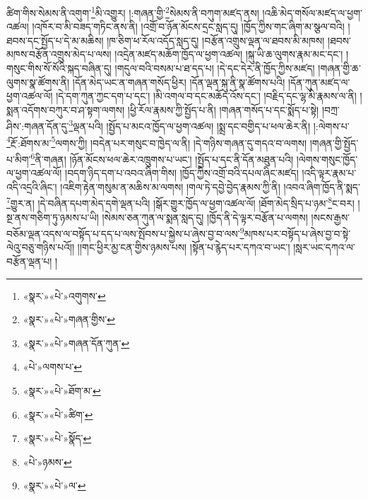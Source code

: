 ཚིག་གིས་སེམས་ནི་འགུག་\footnote{«སྣར་»«པེ་»འགུགས་}མི་འགྱུར། །:གཞན་གྱི་\footnote{«སྣར་»«པེ་»གཞན་གྱིས་}སེམས་ནི་བཀུག་མཛད་ནས། །འཆི་མེད་གསོལ་མཛད་ལ་ཕྱག་འཚལ། །འཁོར་བ་མི་བཟད་གཏིང་ནས་ནི། །འགྲོ་བ་ཉོན་མོངས་དྲང་སླད་དུ། །ཁྱོད་ཀྱིས་གང་ཞིག་མ་སྩལ་བའི། །ཐབས་དང་སྤྱོད་པ་དེ་མ་མཆིས། །ཁ་ཅིག་ཕ་རོལ་འདོད་སླད་དུ། །བརྩོན་འགྲུས་ལྡན་ལ་ཐབས་མི་མཁས། །ཐབས་མཁས་བརྩོན་འགྲུས་མེད་པ་ལས། །འདྲེན་མཛད་མཆོག་ཁྱོད་ལ་ཕྱག་འཚལ། །སྐུ་ཡི་ཆ་ལུགས་རྣམ་མང་དང་། །གསུང་གིས་སོ་སོའི་སྐད་བཞིན་དུ། །གདུལ་བའི་བསམ་པ་ཐ་དད་པ། །དེ་དང་དེར་ནི་ཁྱོད་ཀྱིས་མཛད། །གཞན་གྱི་ཆ་ལུགས་སྣ་ཚོགས་ནི། །དོན་མེད་ཡང་ན་གཞན་གསོད་ཕྱིར། །དོན་ལྡན་སྐུ་ནི་སྣ་ཚོགས་པའི། །དོན་ཀུན་མཛད་ལ་ཕྱག་འཚལ་ལོ། །དེ་དག་ཀུན་ཀྱང་དག་པ་དང་། །མི་འགལ་བ་དང་མཆོད་འོས་དང་། །བརྗིད་དང་ལྷ་མི་རྣམས་ལ་ནི། །སྨན་འདོགས་བཀུར་བ་ཤ་སྟག་ལགས། །ཕྱི་རོལ་རྣམས་ཀྱི་སྤྱོད་པ་ནི། །གཞན་གསོད་པ་དང་སྨོད་པ་སྟེ། །བཀྲ་ཤིས་:གཞན་དོན་དུ་\footnote{«སྣར་»«པེ་»གཞན་དོན་ཀུན་}ལྡན་པའི། །སྤྱོད་པ་མངའ་ཁྱོད་ལ་ཕྱག་འཚལ། །སྨྲ་དང་བགྱིད་པ་ཕལ་ཆེར་ནི། །:ལེགས་པ་\footnote{«པེ་»ལགས་པ་}རྔོ་:ཐོགས་མ་\footnote{«སྣར་»«པེ་»ཐོག་མ་}ལགས་ཀྱི། །བདེན་པར་གསུང་བ་ཁྱེད་ལ་ནི། །དེ་གཉིས་གཞན་དུ་གདའ་བ་ལགས། །གཞན་གྱི་སྤྱོད་པ་མིག་\footnote{«སྣར་»«པེ་»ཚིག་}ནི་གཞན། །ཉོན་མོངས་ཕལ་ཆེར་འཁྲུགས་པ་ཡང་། །སྤྱོད་པ་དང་ནི་དོན་མཐུན་པའི། །ལེགས་གསུང་ཁྱོད་ལ་ཕྱག་འཚལ་ལོ། །བདག་ཉིད་དག་པ་འབའ་ཞིག་གིས། །ཁྱོད་ཀྱིས་འགྲོ་བའི་དཔལ་ཞིང་མཛད། །འདི་ལྟར་རྣམ་པ་འདི་འདྲའི་ཞིང་། །འཇིག་རྟེན་གསུམ་ན་མཆིས་མ་ལགས། །གལ་ཏེ་དབྱེ་བྱེད་རྣམས་ཀྱི་ནི། །འབའ་ཞིག་ཁྱོད་ནི་སྨད་\footnote{«སྣར་»«པེ་»སྣོད་}གྱུར་ན། །དེ་བཞིན་དཔག་མེད་དགེ་ལྡན་པའི། །སྒོར་གྱུར་ཁྱོད་ལ་ཕྱག་འཚལ་ལོ། །ཐོག་མེད་སྲིད་པ་ཉམ་\footnote{«པེ་»ཉམས་}ང་བར། །སྔ་ནས་གཅིག་ཏུ་ཉམས་པ་ཡི། །སེམས་ཅན་ཀུན་ལ་སྨན་སླད་དུ། །ཁྱོད་ནི་དེ་ལྟར་བརྩོན་པ་ལགས། །སངས་རྒྱས་བཅོམ་ལྡན་འདས་ལ་བསྟོད་པ་དད་པ་ལས་སྤོབས་པ་སྐྱེས་པ་ཞེས་བྱ་བ་ལས་\footnote{«སྣར་»«པེ་»ལ་}མཁས་པར་བསྟོད་པ་ཞེས་བྱ་བ་སྟེ་ལེའུ་བཅུ་གཉིས་པའོ།། །།གང་ཕྱིར་མྱ་ངན་གྱིས་ཉམས་པས། །སྟོན་པ་རྙེད་པར་དཀའ་བ་ཡང་། །སླར་ཡང་དཀའ་ལ་བརྩོན་ལྡན་པ། །
